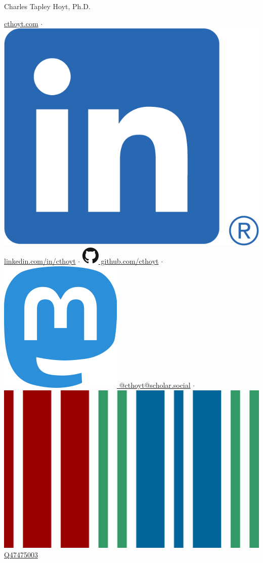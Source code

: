 \documentclass[11pt,a4paper,sans]{moderncv} %
\begin{document}
{\Huge Charles Tapley Hoyt, Ph.D.}

\vspace{3mm}

\href{https://cthoyt.com}{cthoyt.com}
$\cdot$
\href{https://linkedin.com/in/cthoyt}{\includegraphics[scale=0.055]{img/LI-In-Bug} linkedin.com/in/cthoyt}
$\cdot$
\href{https://github.com/cthoyt}{\includegraphics[scale=0.25]{img/GitHub-Mark-32px} github.com/cthoyt}
$\cdot$
\href{https://scholar.social/@cthoyt}{\includegraphics[scale=0.25]{img/mastodon} @cthoyt@scholar.social}
$\cdot$
\href{https://www.wikidata.org/wiki/Q47475003}{\includegraphics[scale=0.01]{img/wikidata_logo} Q47475003}
\end{document}

